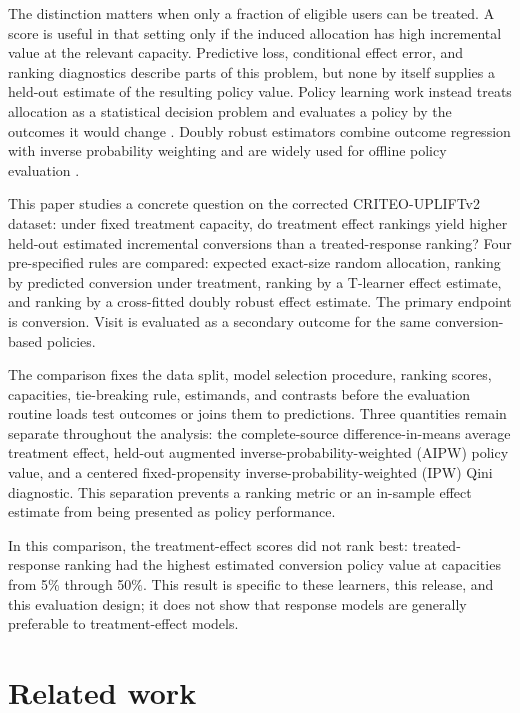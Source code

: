 \documentclass[11pt]{article}
\begin{document}
The distinction matters when only a fraction of eligible users can be treated. A score is useful in that setting only if the induced allocation has high incremental value at the relevant capacity. Predictive loss, conditional effect error, and ranking diagnostics describe parts of this problem, but none by itself supplies a held-out estimate of the resulting policy value. Policy learning work instead treats allocation as a statistical decision problem and evaluates a policy by the outcomes it would change \citep{kitagawa2018treatment,athey2021policy}. Doubly robust estimators combine outcome regression with inverse probability weighting and are widely used for offline policy evaluation \citep{dudik2011dr}.

This paper studies a concrete question on the corrected CRITEO-UPLIFTv2 dataset: under fixed treatment capacity, do treatment effect rankings yield higher held-out estimated incremental conversions than a treated-response ranking? Four pre-specified rules are compared: expected exact-size random allocation, ranking by predicted conversion under treatment, ranking by a T-learner effect estimate, and ranking by a cross-fitted doubly robust effect estimate. The primary endpoint is conversion. Visit is evaluated as a secondary outcome for the same conversion-based policies.

The comparison fixes the data split, model selection procedure, ranking scores, capacities, tie-breaking rule, estimands, and contrasts before the evaluation routine loads test outcomes or joins them to predictions. Three quantities remain separate throughout the analysis: the complete-source difference-in-means average treatment effect, held-out augmented inverse-probability-weighted (AIPW) policy value, and a centered fixed-propensity inverse-probability-weighted (IPW) Qini diagnostic. This separation prevents a ranking metric or an in-sample effect estimate from being presented as policy performance.

In this comparison, the treatment-effect scores did not rank best: treated-response ranking had the highest estimated conversion policy value at capacities from 5\% through 50\%. This result is specific to these learners, this release, and this evaluation design; it does not show that response models are generally preferable to treatment-effect models.

\section{Related work}
\end{document}
